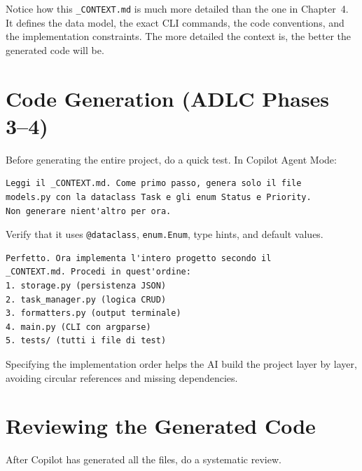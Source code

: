\begin{notebox}
Notice how this \texttt{\_CONTEXT.md} is much more detailed than the one in Chapter~4. It defines the data model, the exact CLI commands, the code conventions, and the implementation constraints. The more detailed the context is, the better the generated code will be.
\end{notebox}

\section{Code Generation (ADLC Phases 3--4)}

\begin{praticabox}[title={Hands-on --- Phase 3: Proof of Value}]
Before generating the entire project, do a quick test. In Copilot Agent Mode:
\begin{lstlisting}[language={}]
Leggi il _CONTEXT.md. Come primo passo, genera solo il file
models.py con la dataclass Task e gli enum Status e Priority.
Non generare nient'altro per ora.
\end{lstlisting}
Verify that it uses \texttt{@dataclass}, \texttt{enum.Enum}, type hints, and default values.
\end{praticabox}

\begin{praticabox}[title={Hands-on --- Phase 4: Full generation}]
\begin{lstlisting}[language={}]
Perfetto. Ora implementa l'intero progetto secondo il
_CONTEXT.md. Procedi in quest'ordine:
1. storage.py (persistenza JSON)
2. task_manager.py (logica CRUD)
3. formatters.py (output terminale)
4. main.py (CLI con argparse)
5. tests/ (tutti i file di test)
\end{lstlisting}
\end{praticabox}

\begin{tipbox}
Specifying the implementation order helps the AI build the project layer by layer, avoiding circular references and missing dependencies.
\end{tipbox}

\section{Reviewing the Generated Code}

After Copilot has generated all the files, do a systematic review.

